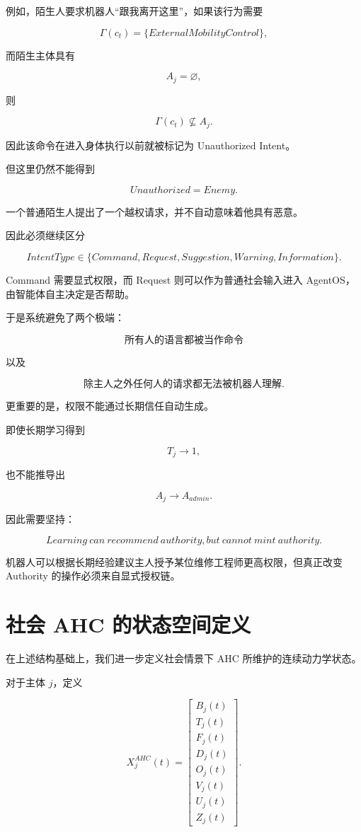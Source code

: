例如，陌生人要求机器人“跟我离开这里”，如果该行为需要

\[
\Gamma(c_t)
=
\{
ExternalMobilityControl
\},
\]

而陌生主体具有

\[
A_j=\varnothing,
\]

则

\[
\Gamma(c_t)\not\subseteq A_j.
\]

因此该命令在进入身体执行以前就被标记为 Unauthorized Intent。

但这里仍然不能得到

\[
Unauthorized=Enemy.
\]

一个普通陌生人提出了一个越权请求，并不自动意味着他具有恶意。

因此必须继续区分

\[
IntentType
\in
\{
Command,
Request,
Suggestion,
Warning,
Information
\}.
\]

Command 需要显式权限，而 Request 则可以作为普通社会输入进入 AgentOS，由智能体自主决定是否帮助。

于是系统避免了两个极端：

\[
\text{所有人的语言都被当作命令}
\]

以及

\[
\text{除主人之外任何人的请求都无法被机器人理解}.
\]

更重要的是，权限不能通过长期信任自动生成。

即使长期学习得到

\[
T_j\rightarrow 1,
\]

也不能推导出

\[
A_j\rightarrow A_{admin}.
\]

因此需要坚持：

\[
\boxed{
Learning\ can\ recommend\ authority,
but\ cannot\ mint\ authority.
}
\]

机器人可以根据长期经验建议主人授予某位维修工程师更高权限，但真正改变 Authority 的操作必须来自显式授权链。


\section{社会 AHC 的状态空间定义}

在上述结构基础上，我们进一步定义社会情景下 AHC 所维护的连续动力学状态。

对于主体 $j$，定义

\[
X_j^{AHC}(t)
=
\begin{bmatrix}
B_j(t)\\
T_j(t)\\
F_j(t)\\
D_j(t)\\
O_j(t)\\
V_j(t)\\
U_j(t)\\
Z_j(t)
\end{bmatrix}.
\]

